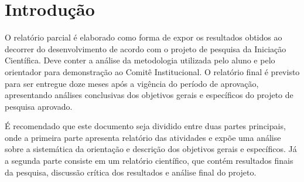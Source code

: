 \chapter{Introdução}

O relatório parcial é elaborado como forma de expor os resultados obtidos ao decorrer do desenvolvimento de acordo com o projeto de pesquisa da Iniciação Científica. Deve conter a análise da metodologia utilizada pelo aluno e pelo orientador para demonstração ao Comitê Institucional. O relatório final é previsto para ser entregue doze meses após a vigência do período de aprovação, apresentando análises conclusivas dos objetivos gerais e específicos do projeto de pesquisa aprovado.

É recomendado que este documento seja dividido entre duas partes principais, onde a primeira parte apresenta relatório das atividades e expõe uma análise sobre a sistemática da orientação e descrição dos objetivos gerais e específicos. Já a segunda parte consiste em um relatório científico, que contém resultados finais da pesquisa, discussão crítica dos resultados e análise final do projeto.